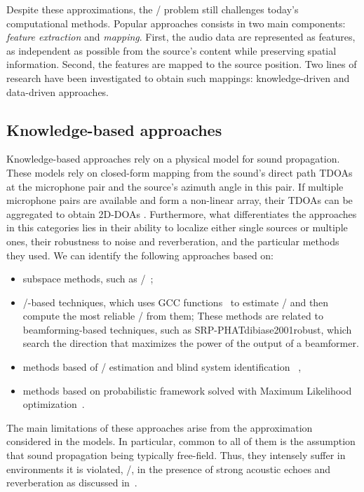 \mynewline
Despite
 these approximations, the \SSL/ problem still challenges today's computational methods.
Popular approaches consists in two main components: \textit{feature extraction} and \textit{mapping}.
First, the audio data are represented as features, as independent as possible from the source's content while preserving spatial information.
Second, the features are mapped to the source position.
Two lines of research have been investigated to obtain such mappings: knowledge-driven and data-driven approaches.

\subsection{Knowledge-based approaches}
Knowledge-based approaches rely on a physical model for sound propagation. %
These models rely on closed-form mapping from the sound's direct path \acl{TDOAs} at the microphone pair and the source's azimuth angle in this pair.
If multiple microphone pairs are available and form a non-linear array, their TDOAs can be aggregated to obtain 2D-\ac{DOA}s .
Furthermore, what differentiates the approaches in this categories lies in their ability to localize either single sources or multiple ones, their robustness to noise and reverberation, and the particular methods they used.
We can identify the following approaches based on:
\begin{itemize}
    \item subspace methods, such as \MUSIC/~;
    \item \TDOA/-based techniques, which uses \ac{GCC} functions~ to estimate \TDOA/ and then compute the most reliable \DOA/ from them;
    These methods are related to beamforming-based techniques, such as SRP-PHAT\ac{dibiase2001robust}, which search the direction that maximizes the power of the output of a beamformer.
    \item methods based of \RIRs/ estimation and blind system identification ~,
    \item methods based on probabilistic framework solved with Maximum Likelihood optimization~.
\end{itemize}
The main limitations of these approaches arise from the approximation considered in the models.
In particular, common to all of them is the assumption that sound propagation being typically free-field.
Thus, they intensely suffer in environments it is violated, \eg/, in the presence of strong acoustic echoes and reverberation as discussed in~.

